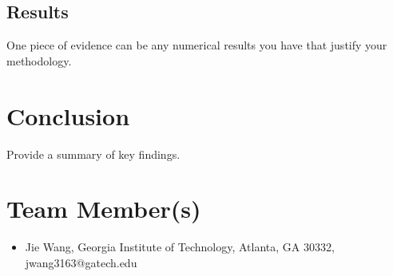 \documentclass[competition,nonblindrev]{informs3-competition}
\begin{document}
\subsection{Results}
One piece of evidence can be any numerical results you have that justify your methodology.

\section{Conclusion}

Provide a summary of key findings.

\section{Team Member(s)}


\begin{itemize}
\item Jie Wang, Georgia Institute of Technology, Atlanta, GA 30332, jwang3163@gatech.edu
\end{itemize}








 
{
\footnotesize

}


\end{document}
